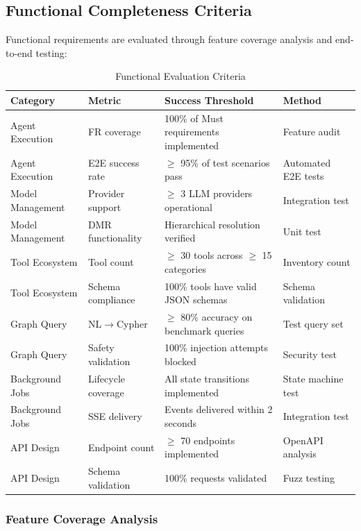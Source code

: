 \subsection{Functional Completeness Criteria}
\label{subsec:functional-criteria}

Functional requirements are evaluated through feature coverage analysis and end-to-end testing:

\begin{table}[htbp]
\centering
\caption{Functional Evaluation Criteria}
\label{tab:functional-eval}
\small
\begin{tabularx}{\textwidth}{|l|l|X|l|}
\hline
\textbf{Category} & \textbf{Metric} & \textbf{Success Threshold} & \textbf{Method} \\
\hline
Agent Execution & FR coverage & 100\% of Must requirements implemented & Feature audit \\
\hline
Agent Execution & E2E success rate & $\geq$ 95\% of test scenarios pass & Automated E2E tests \\
\hline
Model Management & Provider support & $\geq$ 3 LLM providers operational & Integration test \\
\hline
Model Management & DMR functionality & Hierarchical resolution verified & Unit test \\
\hline
Tool Ecosystem & Tool count & $\geq$ 30 tools across $\geq$ 15 categories & Inventory count \\
\hline
Tool Ecosystem & Schema compliance & 100\% tools have valid JSON schemas & Schema validation \\
\hline
Graph Query & NL$\rightarrow$Cypher & $\geq$ 80\% accuracy on benchmark queries & Test query set \\
\hline
Graph Query & Safety validation & 100\% injection attempts blocked & Security test \\
\hline
Background Jobs & Lifecycle coverage & All state transitions implemented & State machine test \\
\hline
Background Jobs & SSE delivery & Events delivered within 2 seconds & Integration test \\
\hline
API Design & Endpoint count & $\geq$ 70 endpoints implemented & OpenAPI analysis \\
\hline
API Design & Schema validation & 100\% requests validated & Fuzz testing \\
\hline
\end{tabularx}
\end{table}

\subsubsection{Feature Coverage Analysis}

